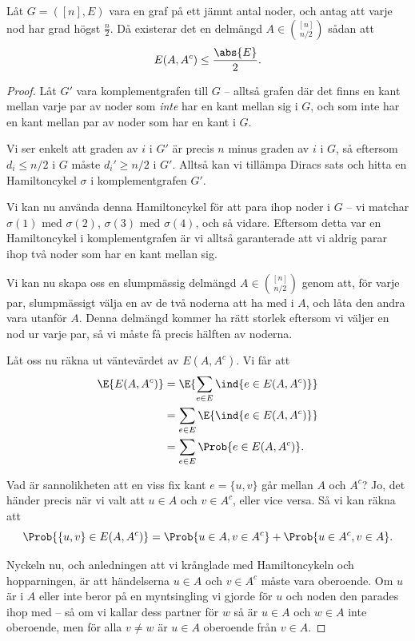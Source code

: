 \documentclass[nobib]{tufte-handout}
\begin{document}
\begin{proposition}
  Låt $G = ([n], E)$ vara en graf på ett jämnt antal noder, och antag att varje nod har grad högst $\frac{n}{2}$. Då existerar det en delmängd $A \in \binom{[n]}{n/2}$ sådan att
  $$E(A, A^c) \leq \frac{\abs{E}}{2}.$$ 

  \begin{proof}
    Låt $G'$ vara komplementgrafen till $G$ -- alltså grafen där det finns en kant mellan varje par av noder som \emph{inte} har en kant mellan sig i $G$, och som inte har en kant mellan par av noder som har en kant i $G$.

    Vi ser enkelt att graden av $i$ i $G'$ är precis $n$ minus graden av $i$ i $G$, så eftersom $d_i \leq n/2$ i $G$ måste $d_i' \geq n/2$ i $G'$. Alltså kan vi tillämpa Diracs sats och hitta en Hamiltoncykel $\sigma$ i komplementgrafen $G'$.

    Vi kan nu använda denna Hamiltoncykel för att para ihop noder i $G$ -- vi matchar $\sigma(1)$ med $\sigma(2)$, $\sigma(3)$ med $\sigma(4)$, och så vidare. Eftersom detta var en Hamiltoncykel i komplementgrafen är vi alltså garanterade att vi aldrig parar ihop två noder som har en kant mellan sig.

    Vi kan nu skapa oss en slumpmässig delmängd $A \in \binom{[n]}{n/2}$ genom att, för varje par, slumpmässigt välja en av de två noderna att ha med i $A$, och låta den andra vara utanför $A$. Denna delmängd kommer ha rätt storlek eftersom vi väljer en nod ur varje par, så vi måste få precis hälften av noderna.

    Låt oss nu räkna ut väntevärdet av $E(A, A^c)$. Vi får att
    \begin{align*}
      \E{E(A, A^c)} &= \E{\sum_{e \in E} \ind{e \in E(A, A^c)}}\\
      &= \sum_{e \in E} \E{\ind{e \in E(A, A^c)}}\\
      &= \sum_{e \in E} \Prob{e \in E(A, A^c)}.
    \end{align*}

    Vad är sannolikheten att en viss fix kant $e = \{u, v\}$ går mellan $A$ och $A^c$? Jo, det händer precis när vi valt att $u \in A$ och $v \in A^c$, eller vice versa. Så vi kan räkna att
    $$\Prob{\{u,v\} \in E(A, A^c)} = \Prob{u \in A, v \in A^c} + \Prob{u \in A^c, v \in A}.$$
    
    Nyckeln nu, och anledningen att vi krånglade med Hamiltoncykeln och hopparningen, är att händelserna $u\in A$ och $v\in A^c$ måste vara oberoende. Om $u$ är i $A$ eller inte beror på en myntsingling vi gjorde för $u$ och noden den parades ihop med -- så om vi kallar dess partner för $w$ så är $u \in A$ och $w \in A$ inte oberoende, men för alla $v \neq w$ är $u \in A$ oberoende från $v \in A$.


\end{proof}
\end{proposition}
\end{document}

